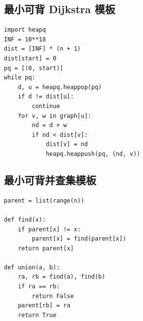 \documentclass[10pt,a4paper,fontset=none]{ctexart}
\begin{document}
\subsection*{最小可背 Dijkstra 模板}
\begin{lstlisting}[style=py]
import heapq
INF = 10**18
dist = [INF] * (n + 1)
dist[start] = 0
pq = [(0, start)]
while pq:
    d, u = heapq.heappop(pq)
    if d != dist[u]:
        continue
    for v, w in graph[u]:
        nd = d + w
        if nd < dist[v]:
            dist[v] = nd
            heapq.heappush(pq, (nd, v))
\end{lstlisting}

\subsection*{最小可背并查集模板}
\begin{lstlisting}[style=py]
parent = list(range(n))

def find(x):
    if parent[x] != x:
        parent[x] = find(parent[x])
    return parent[x]

def union(a, b):
    ra, rb = find(a), find(b)
    if ra == rb:
        return False
    parent[rb] = ra
    return True
\end{lstlisting}
\end{document}
